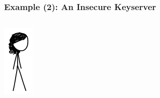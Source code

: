 \documentclass[12pt,english,dvipsnames]{beamer}
\newcommand{\red}[1]{{\color{red}#1}}
\begin{document}
\begin{frame}[fragile]
    \frametitle{Example (2): An \red{Insecure} Keyserver}

    \begin{columns}[b]
        \begin{column}{1.5cm}
        \includegraphics[width=\textwidth]{images/meg.png}
        \end{column}


\end{columns}
\end{frame}
\end{document}
